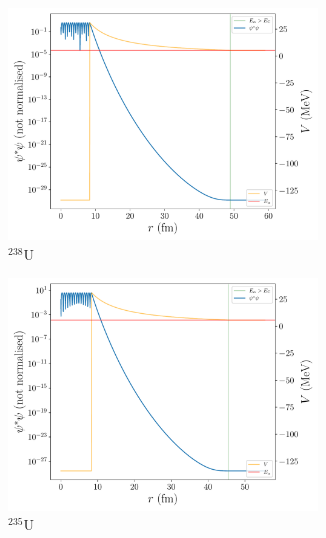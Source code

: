 \documentclass[a4paper,DIV=12,english]{scrartcl}
\begin{document}
\begin{figure}
    \centering
    \begin{subfigure}{0.49\textwidth}
        \centering
        \includegraphics[width=0.9\textwidth]{../plots/density/u238.pdf}
        \caption{$^{238}\text{U}$}
        \label{subfig:density_u238}
    \end{subfigure}
    \begin{subfigure}{0.49\textwidth}
        \centering
        \includegraphics[width=0.9\textwidth]{../plots/density/u235.pdf}
        \caption{$^{235}\text{U}$}
        \label{subfig:density_u235}
    \end{subfigure}\\
    \begin{subfigure}{0.49\textwidth}
        \centering

\end{subfigure}
\end{figure}
\end{document}
